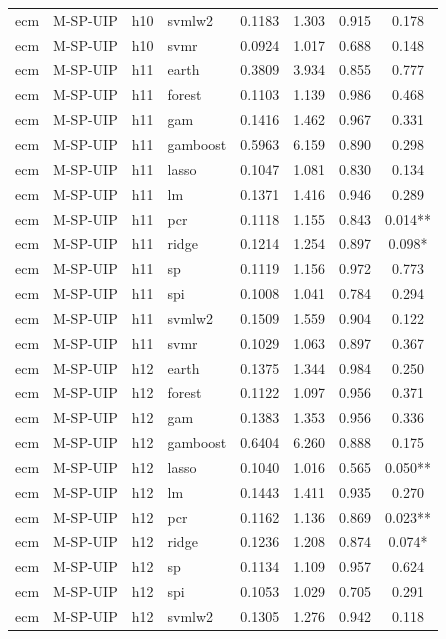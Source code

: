 \begin{ThreePartTable}
\begin{longtable}[t]{llclcccc}
ecm & M-SP-UIP & h10 & svmlw2 & 0.1183 & 1.303 & 0.915 & 0.178\\
ecm & M-SP-UIP & h10 & svmr & 0.0924 & 1.017 & 0.688 & 0.148\\
\addlinespace
ecm & M-SP-UIP & h11 & earth & 0.3809 & 3.934 & 0.855 & 0.777\\
ecm & M-SP-UIP & h11 & forest & 0.1103 & 1.139 & 0.986 & 0.468\\
ecm & M-SP-UIP & h11 & gam & 0.1416 & 1.462 & 0.967 & 0.331\\
ecm & M-SP-UIP & h11 & gamboost & 0.5963 & 6.159 & 0.890 & 0.298\\
ecm & M-SP-UIP & h11 & lasso & 0.1047 & 1.081 & 0.830 & 0.134\\
ecm & M-SP-UIP & h11 & lm & 0.1371 & 1.416 & 0.946 & 0.289\\
ecm & M-SP-UIP & h11 & pcr & 0.1118 & 1.155 & 0.843 & 0.014**\\
ecm & M-SP-UIP & h11 & ridge & 0.1214 & 1.254 & 0.897 & 0.098*\\
ecm & M-SP-UIP & h11 & sp & 0.1119 & 1.156 & 0.972 & 0.773\\
ecm & M-SP-UIP & h11 & spi & 0.1008 & 1.041 & 0.784 & 0.294\\
ecm & M-SP-UIP & h11 & svmlw2 & 0.1509 & 1.559 & 0.904 & 0.122\\
ecm & M-SP-UIP & h11 & svmr & 0.1029 & 1.063 & 0.897 & 0.367\\
\addlinespace
ecm & M-SP-UIP & h12 & earth & 0.1375 & 1.344 & 0.984 & 0.250\\
ecm & M-SP-UIP & h12 & forest & 0.1122 & 1.097 & 0.956 & 0.371\\
ecm & M-SP-UIP & h12 & gam & 0.1383 & 1.353 & 0.956 & 0.336\\
ecm & M-SP-UIP & h12 & gamboost & 0.6404 & 6.260 & 0.888 & 0.175\\
ecm & M-SP-UIP & h12 & lasso & 0.1040 & 1.016 & 0.565 & 0.050**\\
ecm & M-SP-UIP & h12 & lm & 0.1443 & 1.411 & 0.935 & 0.270\\
ecm & M-SP-UIP & h12 & pcr & 0.1162 & 1.136 & 0.869 & 0.023**\\
ecm & M-SP-UIP & h12 & ridge & 0.1236 & 1.208 & 0.874 & 0.074*\\
ecm & M-SP-UIP & h12 & sp & 0.1134 & 1.109 & 0.957 & 0.624\\
ecm & M-SP-UIP & h12 & spi & 0.1053 & 1.029 & 0.705 & 0.291\\
ecm & M-SP-UIP & h12 & svmlw2 & 0.1305 & 1.276 & 0.942 & 0.118\\

\end{longtable}
\end{ThreePartTable}

